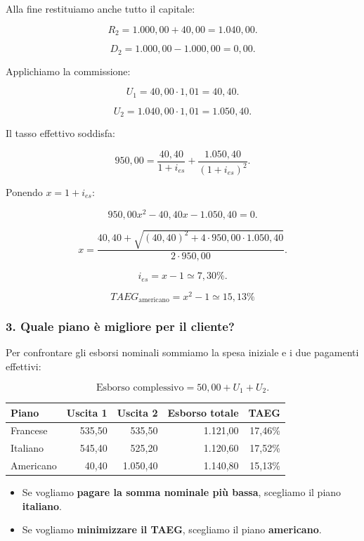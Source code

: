 \noindent Alla fine restituiamo
anche tutto il capitale:

\[
R_2=1.000{,}00+40{,}00=1.040{,}00.
\]

\[
D_2=1.000{,}00-1.000{,}00=0{,}00.
\]

\noindent Applichiamo la commissione:

\[
U_1=40{,}00\cdot1{,}01=\boxed{40{,}40}.
\]

\[
U_2=1.040{,}00\cdot1{,}01=\boxed{1.050{,}40}.
\]

\noindent Il tasso effettivo soddisfa:

\[
950{,}00
=
\frac{40{,}40}{1+i_{es}}
+
\frac{1.050{,}40}{(1+i_{es})^2}.
\]

\noindent Ponendo $x=1+i_{es}$:

\[
950{,}00x^2-40{,}40x-1.050{,}40=0.
\]

\[
x=
\frac{
40{,}40+
\sqrt{(40{,}40)^2+4\cdot950{,}00\cdot1.050{,}40}
}{
2\cdot950{,}00
}.
\]

\[
i_{es}=x-1\simeq\boxed{7{,}30\%}.
\]

\[
\boxed{
TAEG_{\text{americano}}=x^2-1\simeq15{,}13\%
}
\]


\subsubsection*{3. Quale piano è migliore per il cliente?}

\noindent Per confrontare gli esborsi nominali
sommiamo la spesa iniziale e i due pagamenti effettivi:

\[
\text{Esborso complessivo}=50{,}00+U_1+U_2.
\]

\begin{center}
    \small
    \begin{tabular}{|l|r|r|r|r|}
        \hline
        \textbf{Piano}
        & \textbf{Uscita 1}
        & \textbf{Uscita 2}
        & \textbf{Esborso totale}
        & \textbf{TAEG} \\
        \hline
        Francese & 535,50 & 535,50 & 1.121,00 & 17,46\% \\
        Italiano & 545,40 & 525,20 & 1.120,60 & 17,52\% \\
        Americano & 40,40 & 1.050,40 & 1.140,80 & 15,13\% \\
        \hline
    \end{tabular}
\end{center}

\begin{itemize}
    \item Se vogliamo \textbf{pagare la somma nominale
    più bassa}, scegliamo il piano \textbf{italiano}.

    \item Se vogliamo \textbf{minimizzare il TAEG},
    scegliamo il piano \textbf{americano}.
\end{itemize}

